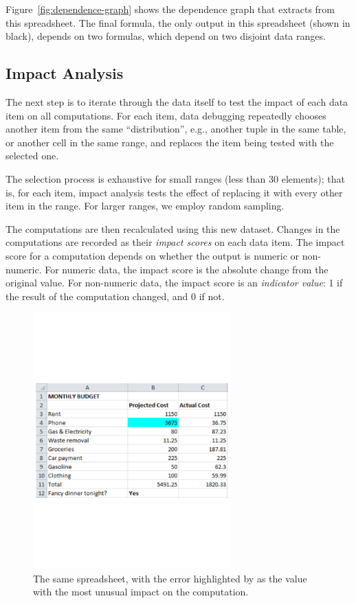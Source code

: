 Figure~\ref{fig:dependence-graph} shows the dependence graph that \checkcell{}
extracts from this spreadsheet. The final formula, the only output in
this spreadsheet (shown in black), depends on two formulas, which depend on two
disjoint data ranges.


\subsection{Impact Analysis}

The next step is to iterate through the data itself to test the impact
of each data item on all computations. For each item, data debugging
repeatedly chooses another item from the same ``distribution'', e.g.,
another tuple in the same table, or another cell in the same range,
and replaces the item being tested with the selected one. 

The selection process is exhaustive for small ranges (less than 30
elements); that is, for each item, impact analysis tests the effect of
replacing it with every other item in the range. For larger ranges, we
employ random sampling.

The computations are then recalculated using this new dataset. Changes
in the computations are recorded as their \emph{impact scores} on each
data item.  The impact score for a computation depends on whether the
output is numeric or non-numeric. For numeric data, the impact score
is the absolute change from the original value.
For non-numeric data, the impact score is an \emph{indicator value}: 1
if the result of the computation changed, and 0 if not.

\begin{figure}[!t]
\centering
\includegraphics[width=3in]{overview-example-highlighted}
  \caption{The same spreadsheet, with the error highlighted by \checkcell{} as the value with the most unusual impact on the computation.\label{fig:personal_budget_highlighted}}
\end{figure}

